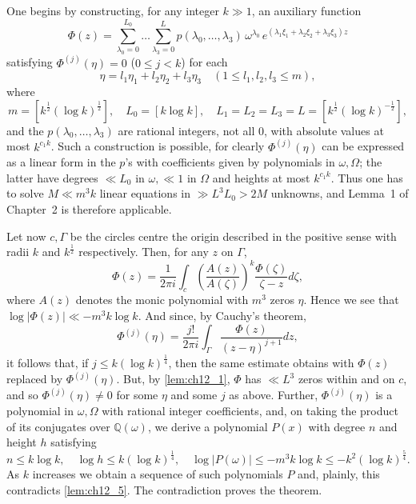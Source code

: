 One begins by constructing, for any integer $k \gg 1$, an auxiliary function
\[\Phi(z) = \sum_{\lambda_0=0}^{L_0} \dots \sum_{\lambda_3=0}^{L} p(\lambda_0, \dots, \lambda_3) \, \omega^{\lambda_0} \, e^{(\lambda_1 \xi_1 + \lambda_2 \xi_2 + \lambda_3 \xi_3) z}\]
satisfying $\Phi^{(j)}(\eta) = 0$ ($0 \le j < k$) for each
\[\eta = l_1 \eta_1 + l_2 \eta_2 + l_3 \eta_3 \quad (1 \leq l_1, l_2, l_3 \leq m),\]
where
\[m = [k^{\frac{1}{2}}(\log k)^{\frac{1}{2}}], \quad L_0 = [k \log k], \quad L_1 = L_2 = L_3 = L = [k^{\frac{1}{2}}(\log k)^{-\frac{1}{2}}],\]
and the $p(\lambda_0, \dots, \lambda_3)$ are rational integers, not all 0, with absolute values at most $k^{c_1 k}$. Such a construction is possible, for clearly $\Phi^{(j)}(\eta)$ can be expressed as a linear form in the $p$'s with coefficients given by polynomials in $\omega, \Omega$; the latter have degrees $\ll L_0$ in $\omega, \ll 1$ in $\Omega$ and heights at most $k^{c_1 k}$. Thus one has to solve $M \ll m^3 k$ linear equations in $\gg L^3 L_0 > 2M$ unknowns, and Lemma~1 of Chapter~2 is therefore applicable.

Let now $c, \Gamma$ be the circles centre the origin described in the positive sense with radii $k$ and $k^{\frac{1}{2}}$ respectively. Then, for any $z$ on $\Gamma$,
\[\Phi(z) = \frac{1}{2\pi i} \int_{c} \left(\frac{A(z)}{A(\zeta)}\right)^k \frac{\Phi(\zeta)}{\zeta - z} d\zeta,\]
where $A(z)$ denotes the monic polynomial with $m^3$ zeros $\eta$. Hence we see that $\log |\Phi(z)| \ll -m^3 k \log k$. And since, by Cauchy's theorem,
\[\Phi^{(j)}(\eta) = \frac{j!}{2\pi i} \int_{\Gamma} \frac{\Phi(z)}{(z-\eta)^{j+1}} dz,\]
it follows that, if $j \leq k(\log k)^{\frac{1}{4}}$, then the same estimate obtains with $\Phi(z)$ replaced by $\Phi^{(j)}(\eta)$. But, by \autoref{lem:ch12_1}, $\Phi$ has $\ll L^3$ zeros within and on $c$, and so $\Phi^{(j)}(\eta) \neq 0$ for some $\eta$ and some $j$ as above. Further, $\Phi^{(j)}(\eta)$ is a polynomial in $\omega, \Omega$ with rational integer coefficients, and, on taking the product of its conjugates over $\mathbb{Q}(\omega)$, we derive a polynomial $P(x)$ with degree $n$ and height $h$ satisfying
\[n \leqslant k \log k, \quad \log h \leqslant k(\log k)^{\frac{1}{4}}, \quad \log |P(\omega)| \leqslant -m^3 k \log k \leqslant -k^2 (\log k)^{\frac{5}{4}}.\]
As $k$ increases we obtain a sequence of such polynomials $P$ and, plainly, this contradicts \autoref{lem:ch12_5}. The contradiction proves the theorem.


